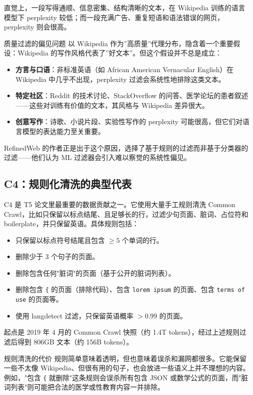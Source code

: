 \documentclass[a4paper]{article}
\begin{document}
直觉上，一段写得通顺、信息密集、结构清晰的文本，在 Wikipedia 训练的语言模型下 perplexity 较低；而一段充满广告、重复短语和语法错误的网页，perplexity 则会很高。

\begin{warningbox}{质量过滤的偏见问题}
以 Wikipedia 作为”高质量”代理分布，隐含着一个重要假设：Wikipedia 的写作风格代表了”好文本”。但这个假设并不总是成立：
\begin{itemize}
    \item \textbf{方言与口语}：非标准英语（如 African American Vernacular English）在 Wikipedia 中几乎不出现，perplexity 过滤会系统性地排除这类文本。
    \item \textbf{特定社区}：Reddit 的技术讨论、StackOverflow 的问答、医学论坛的患者叙述——这些对训练有价值的文本，其风格与 Wikipedia 差异很大。
    \item \textbf{创意写作}：诗歌、小说片段、实验性写作的 perplexity 可能很高，但它们对语言模型的表达能力至关重要。
\end{itemize}
RefinedWeb 的作者正是出于这个原因，选择了基于规则的过滤而非基于分类器的过滤——他们认为 ML 过滤器会引入难以察觉的系统性偏见。
\end{warningbox}

\subsection{C4：规则化清洗的典型代表}

C4 是 T5 论文里最重要的数据贡献之一。它使用大量手工规则清洗 Common Crawl，比如只保留以标点结尾、且足够长的行，过滤少句页面、脏词、占位符和 boilerplate，并只保留英语。具体规则包括：

\begin{itemize}
    \item 只保留以标点符号结尾且包含 $\geq 5$ 个单词的行。
    \item 删除少于 3 个句子的页面。
    \item 删除包含任何"脏词"的页面（基于公开的脏词列表）。
    \item 删除包含 \texttt{\{} 的页面（排除代码）、包含 \texttt{lorem ipsum} 的页面、包含 \texttt{terms of use} 的页面等。
    \item 使用 langdetect 过滤，只保留英语概率 $> 0.99$ 的页面。
\end{itemize}

起点是 2019 年 4 月的 Common Crawl 快照（约 1.4T tokens），经过上述规则过滤后得到 806GB 文本（约 156B tokens）。

\begin{warningbox}{规则清洗的代价}
规则简单意味着透明，但也意味着误杀和漏网都很多。它能保留一些不太像 Wikipedia、但很有用的句子，也会放进一些语义上并不理想的内容。例如，"包含 \texttt{\{} 就删除"这条规则会误杀所有包含 JSON 或数学公式的页面，而"脏词列表"则可能把合法的医学或性教育内容一并排除。
\end{warningbox}
\end{document}
